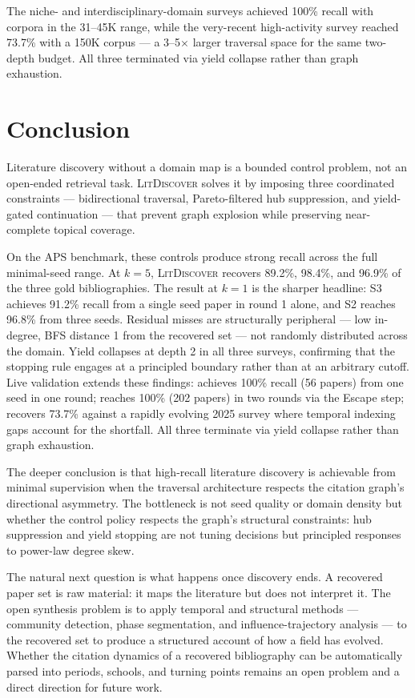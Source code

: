 \documentclass[12pt]{article}
\newcommand{\ldiscover}{\textsc{LitDiscover}}
\begin{document}
The niche- and interdisciplinary-domain surveys achieved 100\% recall with corpora in the
31--45K range, while the very-recent high-activity survey reached 73.7\% with a 150K corpus
--- a 3--5$\times$ larger traversal space for the same two-depth budget. All three terminated
via yield collapse rather than graph exhaustion.

\section{Conclusion}

Literature discovery without a domain map is a bounded control problem, not an open-ended
retrieval task. \ldiscover{} solves it by imposing three coordinated constraints
--- bidirectional traversal, Pareto-filtered hub suppression, and yield-gated continuation
--- that prevent graph explosion while preserving near-complete topical coverage.

On the APS benchmark, these controls produce strong recall across the full minimal-seed
range. At $k = 5$, \ldiscover{} recovers 89.2\%, 98.4\%, and 96.9\% of the three gold
bibliographies. The result at $k = 1$ is the sharper headline: S3 achieves 91.2\% recall
from a single seed paper in round 1 alone, and S2 reaches 96.8\% from three seeds.
Residual misses are structurally peripheral --- low in-degree, BFS distance 1 from the
recovered set --- not randomly distributed across the domain. Yield collapses at depth 2
in all three surveys, confirming that the stopping rule engages at a principled boundary
rather than at an arbitrary cutoff. Live validation extends these findings:
\citet{Bobrowski2018} achieves 100\% recall (56 papers) from one seed in one round;
\citet{Galesic2021} reaches 100\% (202 papers) in two rounds via the Escape step;
\citet{Liu2025} recovers 73.7\% against a rapidly evolving 2025 survey where temporal
indexing gaps account for the shortfall. All three terminate via yield collapse rather
than graph exhaustion.

The deeper conclusion is that high-recall literature discovery is achievable from minimal
supervision when the traversal architecture respects the citation graph's directional
asymmetry. The bottleneck is not seed quality or domain density but whether the control
policy respects the graph's structural constraints: hub suppression and yield stopping are
not tuning decisions but principled responses to power-law degree skew.

The natural next question is what happens once discovery ends. A recovered paper set is
raw material: it maps the literature but does not interpret it. The open synthesis problem
is to apply temporal and structural methods --- community detection, phase segmentation,
and influence-trajectory analysis --- to the recovered set to produce a structured account
of how a field has evolved. Whether the citation dynamics of a recovered bibliography can
be automatically parsed into periods, schools, and turning points remains an open
problem and a direct direction for future work.



\end{document}
